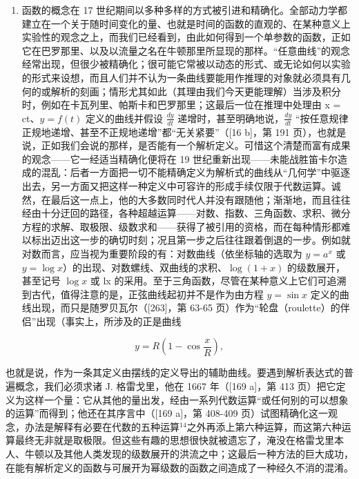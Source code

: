 \begin{enumerate}
\def\labelenumi{\Alph{enumi})}
\setcounter{enumi}{6}
\tightlist
\item
  函数的概念在 17 世纪期间以多种多样的方式被引进和精确化。全部动力学都建立在一个关于随时间变化的量、也就是时间的函数的直观的、在某种意义上实验性的观念之上，而我们已经看到，由此如何得到一个单参数的函数，正如它在巴罗那里、以及以流量之名在牛顿那里所显现的那样。“任意曲线”的观念经常出现，但很少被精确化；很可能它常被以动态的形式、或无论如何以实验的形式来设想，而且人们并不认为一条曲线要能用作推理的对象就必须具有几何的或解析的刻画；情形尤其如此（其理由我们今天更能理解）当涉及积分时，例如在卡瓦列里、帕斯卡和巴罗那里；这最后一位在推理中处理由 x = ct、\(y = f(t)\) 定义的曲线并假设 \(\frac{dy}{dt}\) 递增时，甚至明确地说，\(\frac{dy}{dt}\) “按任意规律正规地递增、甚至不正规地递增”都“无关紧要”（{[}16 b{]}，第 191 页），也就是说，正如我们会说的那样，是否能有一个解析定义。可惜这个清楚而富有成果的观念——它一经适当精确化便将在 19 世纪重新出现——未能战胜笛卡尔造成的混乱：后者一方面把一切不能精确定义为解析式的曲线从“几何学”中驱逐出去，另一方面又把这样一种定义中可容许的形成手续仅限于代数运算。诚然，在最后这一点上，他的大多数同时代人并没有跟随他；渐渐地，而且往往经由十分迂回的路径，各种超越运算——对数、指数、三角函数、求积、微分方程的求解、取极限、级数求和——获得了被引用的资格，而在每种情形都难以标出迈出这一步的确切时刻；况且第一步之后往往跟着倒退的一步。例如就对数而言，应当视为重要阶段的有：对数曲线（依坐标轴的选取为 \(y = a^{x}\) 或 \(y = \log x\)）的出现、对数螺线、双曲线的求积、\(\log(1 + x)\) 的级数展开，甚至记号 \(\log x\) 或 lx 的采用。至于三角函数，尽管在某种意义上它们可追溯到古代，值得注意的是，正弦曲线起初并不是作为由方程 \(y = \sin x\) 定义的曲线出现，而只是随罗贝瓦尔（{[}263{]}，第 63-65 页）作为“轮盘（roulette）的伴侣”出现（事实上，所涉及的正是曲线
\end{enumerate}

\[
y = R \left(1 - \cos \frac {x}{R}\right),
\]

也就是说，作为一条其定义由摆线的定义导出的辅助曲线。要遇到解析表达式的普遍概念，我们必须求诸 J. 格雷戈里，他在 1667 年（{[}169 a{]}，第 413 页）把它定义为这样一个量：它从其他的量出发，经由一系列代数运算“或任何别的可以想象的运算”而得到；他还在其序言中（{[}169 a{]}，第 408-409 页）试图精确化这一观念，办法是解释有必要在代数的五种运算\(^{14}\)之外再添上第六种运算，而这第六种运算最终无非就是取极限。但这些有趣的思想很快就被遗忘了，淹没在格雷戈里本人、牛顿以及其他人类发现的级数展开的洪流之中；这最后一种方法的巨大成功，在能有解析定义的函数与可展开为幂级数的函数之间造成了一种经久不消的混淆。

